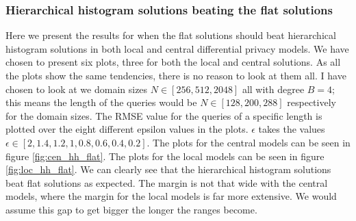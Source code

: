 \documentclass[11pt]{article}
\theoremstyle{definition}
\begin{document}
\subsubsection{Hierarchical histogram solutions beating the flat solutions}
Here we present the results for when the flat solutions should beat hierarchical histogram solutions in both local and central differential privacy models. We have chosen to present six plots, three for both the local and central solutions. As all the plots show the same tendencies, there is no reason to look at them all. I have chosen to look at we domain sizes $N\in[256,512,2048]$ all with degree $B=4$; this means the length of the queries would be $N\in[128, 200, 288]$ respectively for the domain sizes. The RMSE value for the queries of a specific length is plotted over the eight different epsilon values in the plots. $\epsilon$ takes the values $\epsilon\in[2, 1.4, 1.2, 1, 0.8, 0.6, 0.4, 0.2]$.  The plots for the central models can be seen in figure \ref{fig:cen_hh_flat}. The plots for the local models can be seen in figure \ref{fig:loc_hh_flat}. We can clearly see that the hierarchical histogram solutions beat flat solutions as expected. The margin is not that wide with the central models, where the margin for the local models is far more extensive. We would assume this gap to get bigger the longer the ranges become.
\end{document}
